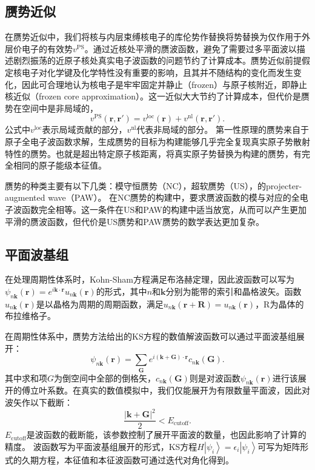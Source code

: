 \subsection{赝势近似}
在赝势近似中，我们将核与内层束缚核电子的库伦势作替换将势替换为仅作用于外层价电子的有效势$v^\mathrm{PS}$。通过近核处平滑的赝波函数，避免了需要过多平面波以描述剧烈振荡的近原子核处真实电子波函数的问题节约了计算成本。赝势近似前提假定核电子对化学键及化学特性没有重要的影响，且其并不随结构的变化而发生变化，因此可合理地认为核电子是牢牢固定并静止（frozen）与原子核附近，即静止核近似（frozen core approximation）。这一近似大大节约了计算成本，但代价是赝势在空间中是非局域的，
\begin{equation}
  v^{\mathrm{PS}}(\bm{r},\bm{r'}) = v^{\mathrm{loc}}(\bm{r}) + v^{\mathrm{nl}}(\bm{r},\bm{r'}).
\end{equation}
公式中$v^\mathrm{loc}$表示局域贡献的部分，$v^\mathrm{nl}$代表非局域的部分。
第一性原理的赝势来自于原子全电子波函数求解，生成赝势的目标为构建能够几乎完全复现真实原子势散射特性的赝势。也就是超出特定原子核距离，将真实原子势替换为构建的赝势，有完全相同的原子能级本征值。

赝势的种类主要有以下几类：模守恒赝势（NC）\cite{hamann1979norm}，超软赝势（US）\cite{vanderbilt1990soft}，的projecter-augmented wave（PAW）\cite{blochl1994projector}。 在NC赝势的构建中，要求赝波函数的模与对应的全电子波函数完全相等。这一条件在US和PAW的构建中适当放宽，从而可以产生更加平滑的赝波函数，但代价是US赝势和PAW赝势的数学表达更加复杂。

\subsection{平面波基组}
在处理周期性体系时，Kohn-Sham方程满足布洛赫定理，因此波函数可以写为$\psi_{n\bm{k}}(\bm{r})=e^{i\bm{k}\cdot \bm{r}} u_{n\bm{k}}(\bm{r})$的形式，其中$n$和$\bm{k}$分别为能带的索引和晶格波矢。函数$u_{n\bm{k}}(\bm{r})$是以晶格为周期的周期函数，满足$u_{n\bm{k}}(\bm{r}+\bm{R})=u_{n\bm{k}}(\bm{r})$，R为晶体的布拉维格子。

在周期性体系中，赝势方法给出的KS方程的数值解波函数可以通过平面波基组展开：
\begin{equation}
  \psi_{n\bm{k}}(\bm{r}) = \sum_{\bm{G}}e^{i(\bm{k}+\bm{G})\cdot \bm{r}}c_{n\bm{k}}(\bm{G}).
\end{equation}
其中求和项$G$为倒空间中全部的倒格矢，$c_{n\bm{k}}(\bm{G})$则是对波函数$\psi_{n\bm{k}}(\bm{r})$进行该展开的傅立叶系数。在真实的数值模拟中，我们仅能展开为有限数量平面波，因此对波矢作以下截断：
\begin{equation}
  \frac{|\bm{k} + \bm{G}|^2}{2} < E_{\mathrm{cutoff}}.
\end{equation}
$E_{\mathrm{cutoff}}$是波函数的截断能，该参数控制了展开平面波的数量，也因此影响了计算的精度。
波函数写为平面波基组展开的形式，KS方程$H\left|\psi_i\right>=\epsilon_i\left|\psi_i\right>$可写为矩阵形式的久期方程，本征值和本征波函数可通过迭代对角化得到。

